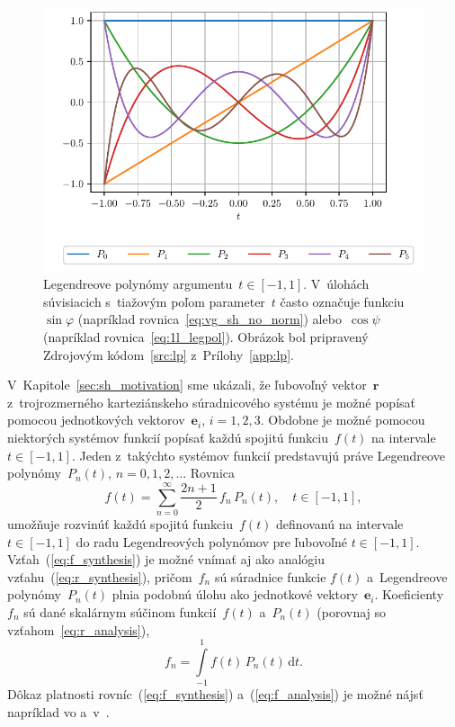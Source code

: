 \documentclass[a4paper, 12pt]{book}
\newcommand{\diff}{\mathrm d}
\let\vec\mathbf
\begin{document}
\begin{figure}[bt]
\centering
\includegraphics{./fig-legendre-polynomials.pdf}
\caption{Legendreove polynómy argumentu~$t \in [-1, 1]$.  V~úlohách súvisiacich 
s~tiažovým poľom parameter~$t$ často označuje funkciu~$\sin\varphi$ (napríklad 
rovnica~\ref{eq:vg_sh_no_norm}) alebo~$\cos\psi$ (napríklad 
rovnica~\ref{eq:1l_legpol}).  Obrázok bol pripravený Zdrojovým
kódom~\ref{src:lp} z~Prílohy~\ref{app:lp}.}
\label{fig:lp}
\end{figure}

V~Kapitole~\ref{sec:sh_motivation} sme ukázali, že ľubovoľný vektor~$\vec r$
z~trojrozmerného karteziánskeho súradnicového systému je možné popísať pomocou
jednotkových vektorov~$\vec e_i$, $i = 1, 2, 3$.  Obdobne je možné pomocou
niektorých systémov funkcií popísať každú spojitú funkciu~$f(t)$ na intervale
$t \in [-1, 1]$.  Jeden z~takýchto systémov funkcií predstavujú práve
Legendreove polynómy~$P_n(t)$, $n = 0, 1, 2, \dots$  Rovnica
%
\begin{equation}
\label{eq:f_synthesis}
f(t) = \sum_{n = 0}^\infty \frac{2n + 1}{2} \, f_n \, P_n(t){,} \quad t \in 
[-1, 1]{,}
\end{equation}
%
umožňuje rozvinúť každú spojitú funkciu~$f(t)$ definovanú na intervale~$t \in 
[-1, 1]$ do radu Legendreových polynómov
pre ľubovoľné $t \in [-1, 1]$.  Vzťah~(\ref{eq:f_synthesis}) je možné vnímať aj
ako analógiu vzťahu~(\ref{eq:r_synthesis}), pričom~$f_n$ sú súradnice funkcie
$f(t)$ a~Legendreove polynómy~$P_n(t)$ plnia podobnú úlohu ako jednotkové
vektory~$\vec e_i$.  Koeficienty~$f_n$ sú dané skalárnym súčinom funkcií~$f(t)$
a~$P_n(t)$ (porovnaj so vzťahom~\ref{eq:r_analysis}),
%
\begin{equation}
\label{eq:f_analysis}
f_n = \int\limits_{-1}^1 f(t) \, P_n(t) \, \diff t{.}
\end{equation}
%
Dôkaz platnosti rovníc~(\ref{eq:f_synthesis}) a~(\ref{eq:f_analysis}) je možné 
nájsť napríklad vo \textcite{Freeden2009} 
a~v~\textcite{SansoGeoidDetermination}.
\end{document}
